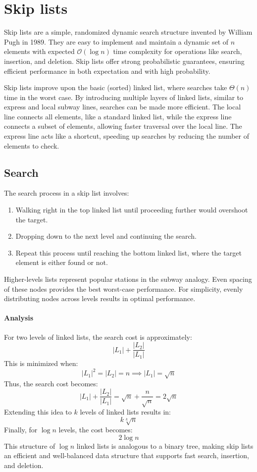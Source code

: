 \section{Skip lists}

Skip lists are a simple, randomized dynamic search structure invented by William Pugh in 1989. 
They are easy to implement and maintain a dynamic set of $n$ elements with expected $\mathcal{O}(\log n)$ time complexity for operations like search, insertion, and deletion.
Skip lists offer strong probabilistic guarantees, ensuring efficient performance in both expectation and with high probability.

Skip lists improve upon the basic (sorted) linked list, where searches take $\Theta(n)$ time in the worst case. 
By introducing multiple layers of linked lists, similar to express and local subway lines, searches can be made more efficient.
The local line connects all elements, like a standard linked list, while the express line connects a subset of elements, allowing faster traversal over the local line.
The express line acts like a shortcut, speeding up searches by reducing the number of elements to check.

\subsection{Search}
The search process in a skip list involves: 
\begin{enumerate} 
    \item Walking right in the top linked list until proceeding further would overshoot the target. 
    \item Dropping down to the next level and continuing the search. 
    \item Repeat this process until reaching the bottom linked list, where the target element is either found or not.
\end{enumerate} 
Higher-levels lists represent popular stations in the subway analogy. 
Even spacing of these nodes provides the best worst-case performance.
For simplicity, evenly distributing nodes across levels results in optimal performance.

\paragraph*{Analysis}
For two levels of linked lists, the search cost is approximately:
\[|L_1|+\dfrac{|L_2|}{|L_1|}\]
This is minimized when:
\[|L_1|^2=|L_2|=n\implies |L_1|=\sqrt{n}\]
Thus, the search cost becomes:
\[|L_1|+\dfrac{|L_2|}{|L_1|}=\sqrt{n}+\dfrac{n}{\sqrt{n}}=2\sqrt{n}\]
Extending this idea to $k$ levels of linked lists results in:
\[k\sqrt[k]{n}\]
Finally, for $\log n$ levels, the cost becomes:
\[2\log n\]
This structure of $\log n$ linked lists is analogous to a binary tree, making skip lists an efficient and well-balanced data structure that supports fast search, insertion, and deletion.

